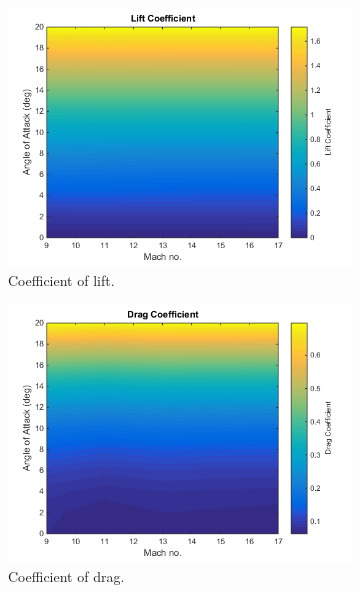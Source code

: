 			\begin{figure}[ht]
				\begin{subfigure}{.5\textwidth}
					\centering
					\includegraphics[width=0.99\linewidth]{figures/3_vehicle_design/ThirdStageCl}
					\caption{Coefficient of lift.}
					\label{fig:Cl-ThirdStage}
				\end{subfigure}
				\begin{subfigure}{.5\textwidth}
					\centering
					\includegraphics[width=0.99\linewidth]{figures/3_vehicle_design/ThirdStageCd}
					\caption{Coefficient of drag.}
					\label{fig:Cd-ThirdStage}
				\end{subfigure}
				\begin{subfigure}{.5\textwidth}
					\centering

\end{subfigure}
\end{figure}
